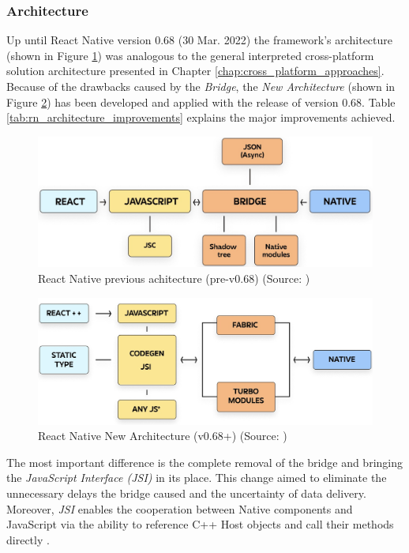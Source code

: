 \subsubsection*{Architecture}

Up until React Native version 0.68 (30 Mar. 2022) the framework's architecture (shown in Figure \ref{fig:rn_old_architecture}) was analogous to the general interpreted cross-platform solution architecture presented in Chapter \ref{chap:cross_platform_approaches}. Because of the drawbacks caused by the \emph{Bridge}, the \emph{New Architecture} (shown in Figure \ref{fig:rn_new_architecture}) has been developed and applied with the release of version 0.68. Table \ref{tab:rn_architecture_improvements} explains the major improvements achieved.

\begin{figure}[h]
    \centering
    \includegraphics[width=.77\textwidth]{img/rn_old_architecture}
    \caption{React Native previous achitecture (pre-v0.68) (Source: \cite{matijevic_rn_rearchitecture})}
    \label{fig:rn_old_architecture}
\end{figure}

\begin{figure}[h]
    \centering
    \includegraphics[width=.77\textwidth]{img/rn_new_architecture}
    \caption{React Native New Architecture (v0.68+) (Source: \cite{matijevic_rn_rearchitecture})}
    \label{fig:rn_new_architecture}
\end{figure}

The most important difference is the complete removal of the bridge and bringing the \emph{JavaScript Interface (JSI)} in its place. This change aimed to eliminate the unnecessary delays the bridge caused and the uncertainty of data delivery. Moreover, \emph{JSI} enables the cooperation between Native components and JavaScript via the ability to reference C++ Host objects and call their methods directly \cite{matijevic_rn_rearchitecture}.

